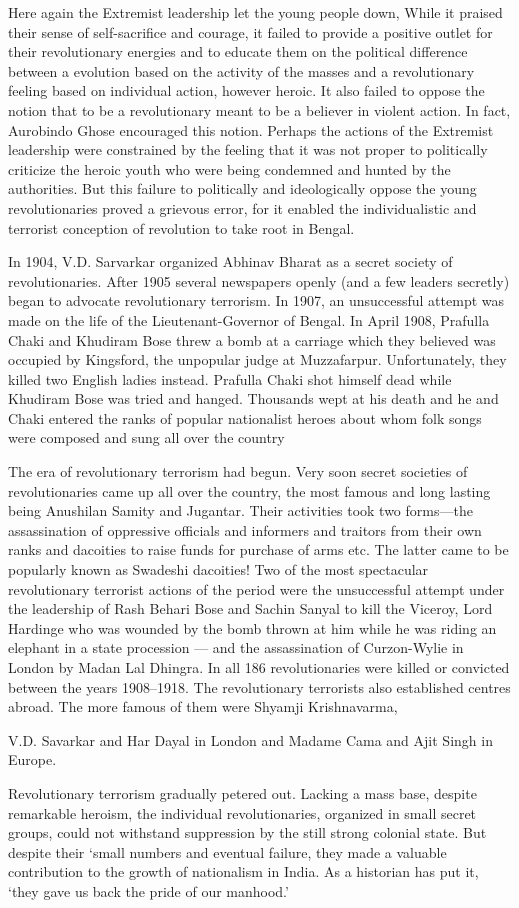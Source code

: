 Here again the Extremist leadership let the young people down, While it praised their sense of self-sacrifice and courage, it failed to provide a positive outlet for their revolutionary energies and to educate them on the political difference between a evolution based on the activity of the masses and a revolutionary feeling based on individual action, however heroic. It also failed to oppose the notion that to be a revolutionary meant to be a believer in violent action. In fact, Aurobindo Ghose encouraged this notion. Perhaps the actions of the Extremist leadership were constrained by the feeling that it was not proper to politically criticize the heroic youth who were being condemned and hunted by the authorities. But this failure to politically and ideologically oppose the young revolutionaries proved a grievous error, for it enabled the individualistic and terrorist conception of revolution to take root in Bengal.

In 1904, V.D. Sarvarkar organized Abhinav Bharat as a secret society of revolutionaries. After 1905 several newspapers openly (and a few leaders secretly) began to advocate revolutionary terrorism. In 1907, an unsuccessful attempt was made on the life of the Lieutenant-Governor of Bengal. In April 1908, Prafulla Chaki and Khudiram Bose threw a bomb at a carriage which they believed was occupied by Kingsford, the unpopular judge at Muzzafarpur. Unfortunately, they killed two English ladies instead. Prafulla Chaki shot himself dead while Khudiram Bose was tried and hanged. Thousands wept at his death and he and Chaki entered the ranks of popular nationalist heroes about whom folk songs were composed and sung all over the country

The era of revolutionary terrorism had begun. Very soon secret societies of revolutionaries came up all over the country, the most famous and long lasting being Anushilan Samity and Jugantar. Their activities took two forms---the assassination of oppressive officials and informers and traitors from their own ranks and dacoities to raise funds for purchase of arms etc. The latter came to be popularly known as Swadeshi dacoities! Two of the most spectacular revolutionary terrorist actions of the period were the unsuccessful attempt under the leadership of Rash Behari Bose and Sachin Sanyal to kill the Viceroy, Lord Hardinge who was wounded by the bomb thrown at him while he was riding an elephant in a state procession --- and the assassination of Curzon-Wylie in London by Madan Lal Dhingra. In all 186 revolutionaries were killed or convicted between the years 1908--1918. The revolutionary terrorists also established centres abroad. The more famous of them were Shyamji Krishnavarma,

V.D. Savarkar and Har Dayal in London and Madame Cama and Ajit Singh in Europe.

Revolutionary terrorism gradually petered out. Lacking a mass base, despite remarkable heroism, the individual revolutionaries, organized in small secret groups, could not withstand suppression by the still strong colonial state. But despite their `small numbers and eventual failure, they made a valuable contribution to the growth of nationalism in India. As a historian has put it, `they gave us back the pride of our manhood.'
